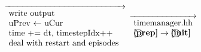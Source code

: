 \begin{landscape}
{\begin{tabular}{|l|}
	\hline 
    \end{tabular}
    {\scriptsize$\overrightarrow
				  {\begin{array}{l}
				  \textnormal{write output}\\
				  \textnormal{uPrev $\leftarrow$ uCur}\\
				  \textnormal{time += dt, timestepIdx++}\\
				  \textnormal{deal with restart and episodes }\\
                                \end{array}}
    $}
    {\scriptsize$\overrightarrow{
    \begin{array}{l}
    \textnormal{timemanager.hh}\\
    \textbf{\textcircled{\ref{prep}}} \rightarrow \textbf{\textcircled{\ref{init}}}
    \end{array}
    }$}
}

\end{landscape}
\normalsize

\newpage 
\pagestyle{scrheadings}

